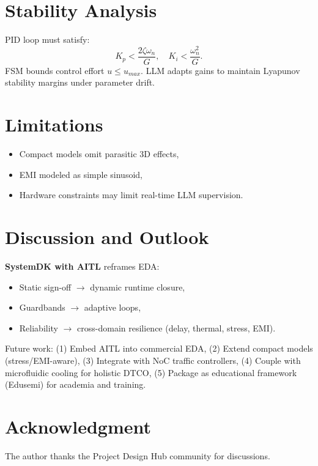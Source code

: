 \documentclass[conference]{IEEEtran}
\begin{document}
\section{Stability Analysis}
PID loop must satisfy:
\begin{equation}
K_p < \frac{2\zeta\omega_n}{G}, \quad K_i < \frac{\omega_n^2}{G}.
\end{equation}
FSM bounds control effort $u \le u_{max}$.
LLM adapts gains to maintain Lyapunov stability margins under parameter drift.

\section{Limitations}
\begin{itemize}
  \item Compact models omit parasitic 3D effects,
  \item EMI modeled as simple sinusoid,
  \item Hardware constraints may limit real-time LLM supervision.
\end{itemize}

\section{Discussion and Outlook}
\textbf{SystemDK with AITL} reframes EDA:
\begin{itemize}
  \item Static sign-off $\to$ dynamic runtime closure,
  \item Guardbands $\to$ adaptive loops,
  \item Reliability $\to$ cross-domain resilience (delay, thermal, stress, EMI).
\end{itemize}
Future work:
(1) Embed AITL into commercial EDA,
(2) Extend compact models (stress/EMI-aware),
(3) Integrate with NoC traffic controllers,
(4) Couple with microfluidic cooling for holistic DTCO,
(5) Package as educational framework (Edusemi) for academia and training.

\section*{Acknowledgment}
The author thanks the Project Design Hub community for discussions.

\clearpage
\end{document}
